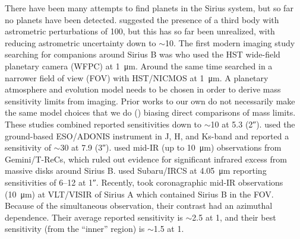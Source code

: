 \documentclass[twocolumn]{aastex631}
\begin{document}
There have been many attempts to find planets in the Sirius system, but so far no planets have been detected. \citet{benestSiriusTripleStar1995} suggested the presence of a third body with astrometric perturbations of \qty{100}{\milliarcsecond}, but this has so far been unrealized, with \citet{bondSiriusSystemIts2017} reducing astrometric uncertainty down to $\sim$\qty{10}{\milliarcsecond}. The first modern imaging study searching for companions around Sirius B was \citet{schroederSearchFaintCompanions2000} who used the HST wide-field planetary camera (WFPC) at \qty{1}{\micro\meter}. Around the same time \citet{kuchnerSearchExozodiacalDust2000} searched in a narrower field of view (FOV) with HST/NICMOS at \qty{1}{\micro\meter}. A planetary atmosphere and evolution model needs to be chosen in order to derive mass sensitivity limits from imaging. Prior works to our own do not necessarily make the same model choices that we do () biasing direct comparisons of mass limits. These studies combined reported sensitivities down to $\sim$\qty{10}{\jupitermass} at \qty{5.3}{\au} (\ang{;;2}).  \citet{bonnet-bidaudADONISHighContrast2008a} used the ground-based ESO/ADONIS instrument in J, H, and Ks-band and reported a sensitivity of $\sim$\qty{30}{\jupitermass} at \qty{7.9}{\au} (\ang{;;3}). \citet{skemerSiriusImagedMidinfrared2011} used mid-IR (up to \qty{10}{\micro\meter}) observations from Gemini/T-ReCs, which ruled out evidence for significant infrared excess from massive disks around Sirius B. \citet{thalmannPiercingGlareDirect2011} used Subaru/IRCS at \qty{4.05}{\micro\meter} reporting sensitivities of \qtyrange{6}{12}{\jupitermass} at \ang{;;1}. Recently, \citet{pathakHighContrastImaging2021} took coronagraphic mid-IR observations (\qty{10}{\micro\meter}) at VLT/VISIR of Sirius A which contained Sirius B in the FOV. Because of the simultaneous observation, their contrast had an azimuthal dependence. Their average reported sensitivity is $\sim$\qty{2.5}{\jupitermass} at \qty{1}{\au}, and their best sensitivity (from the ``inner'' region) is $\sim$\qty{1.5}{\jupitermass} at \qty{1}{\au}. 
\end{document}
